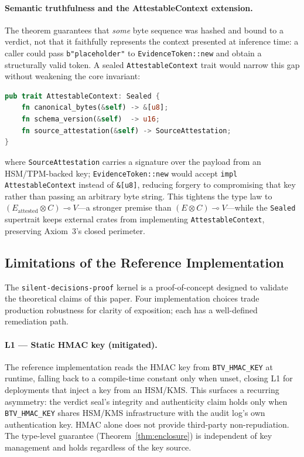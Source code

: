 \paragraph*{Semantic truthfulness and the AttestableContext extension.}
The theorem guarantees that \emph{some} byte sequence was hashed and
bound to a verdict, not that it faithfully represents the context
presented at inference time: a caller could pass
\texttt{b"placeholder"} to \texttt{EvidenceToken::new} and obtain a
structurally valid token. A sealed \texttt{AttestableContext} trait
would narrow this gap without weakening the core invariant:

\begin{lstlisting}[language=Rust,caption={AttestableContext trait
  (proposed extension)}]
pub trait AttestableContext: Sealed {
    fn canonical_bytes(&self) -> &[u8];
    fn schema_version(&self)  -> u16;
    fn source_attestation(&self) -> SourceAttestation;
}
\end{lstlisting}

\noindent
where \texttt{SourceAttestation} carries a signature over the payload
from an HSM/TPM-backed key; \texttt{EvidenceToken::new} would accept
\texttt{impl AttestableContext} instead of \texttt{\&[u8]}, reducing
forgery to compromising that key rather than passing an arbitrary
byte string. This tightens the type law to
$(E_{\text{attested}} \otimes C) \multimap V$---a stronger premise
than $(E \otimes C) \multimap V$---while the
\texttt{Sealed} supertrait keeps external crates from implementing
\texttt{AttestableContext}, preserving Axiom~3's closed perimeter.

\subsection{Limitations of the Reference Implementation}
\label{sec:limitations}

The \texttt{silent-decisions-proof} kernel is a proof-of-concept
designed to validate the theoretical claims of this paper.
Four implementation choices trade production robustness for
clarity of exposition; each has a well-defined remediation path.

\paragraph*{L1 — Static HMAC key (mitigated).}
The reference implementation reads the HMAC key from
\texttt{BTV\_HMAC\_KEY} at runtime, falling back to a compile-time
constant only when unset, closing L1 for deployments that inject a
key from an HSM/KMS. This surfaces a recurring asymmetry: the
verdict seal's integrity and authenticity claim holds only when
\texttt{BTV\_HMAC\_KEY} shares HSM/KMS infrastructure with the audit
log's own authentication key. HMAC alone does not provide third-party
non-repudiation. The type-level guarantee
(Theorem~\ref{thm:enclosure}) is independent of key management and
holds regardless of the key source.

